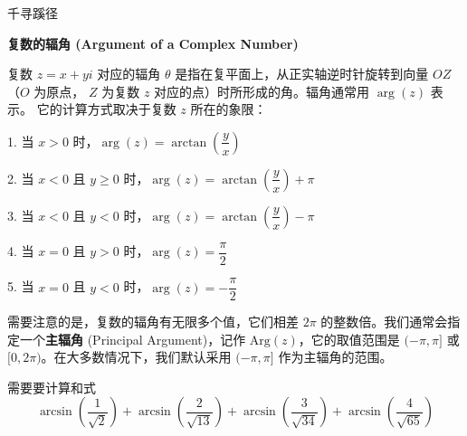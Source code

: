 \documentclass{ctexart}
\begin{document}
\thispagestyle{fancy}

\begin{center}
    \begin{chaptertitle}[复数专题]{\faBookOpen}{千寻蹊径}
    \end{chaptertitle}
\end{center}


\begin{theorembox}
\textbf{复数的辐角 (Argument of a Complex Number)}

复数 $z = x + yi$ 对应的辐角 $\theta$ 是指在复平面上，从正实轴逆时针旋转到向量 $OZ$（$O$ 为原点， $Z$ 为复数 $z$ 对应的点）时所形成的角。辐角通常用 $\arg(z)$ 表示。 它的计算方式取决于复数 $z$ 所在的象限：
\begin{spacing}{2.0}  %
1. 当 $x > 0$ 时，$\arg(z) = \arctan\left(\dfrac{y}{x}\right)$

2. 当 $x < 0$ 且 $y \ge 0$ 时，$\arg(z) = \arctan\left(\dfrac{y}{x}\right) + \pi$

3. 当 $x < 0$ 且 $y < 0$ 时，$\arg(z) = \arctan\left(\dfrac{y}{x}\right) - \pi$

4. 当 $x = 0$ 且 $y > 0$ 时，$\arg(z) = \dfrac{\pi}{2}$

5. 当 $x = 0$ 且 $y < 0$ 时，$\arg(z) = -\dfrac{\pi}{2}$
\end{spacing}
需要注意的是，复数的辐角有无限多个值，它们相差 $2\pi$ 的整数倍。我们通常会指定一个\textbf{主辐角} (Principal Argument)，记作 $\text{Arg}(z)$，它的取值范围是 $(-\pi, \pi]$ 或 $[0, 2\pi)$。在大多数情况下，我们默认采用 $(-\pi, \pi]$ 作为主辐角的范围。
\end{theorembox}

\begin{examplebox}
需要要计算和式
$$
\arcsin \left( \dfrac{1}{\sqrt{2}} \right) + \arcsin \left( \dfrac{2}{\sqrt{13}} \right) + \arcsin \left( \dfrac{3}{\sqrt{34}} \right) + \arcsin \left( \dfrac{4}{\sqrt{65}} \right)
$$
\end{examplebox}
\end{document}

